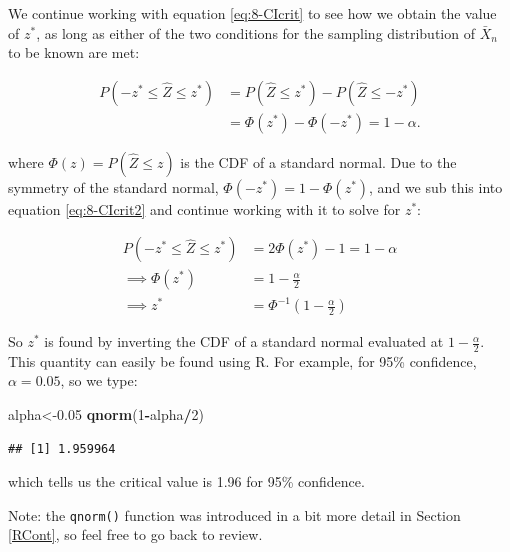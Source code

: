 \documentclass[
]{book}
\newenvironment{Shaded}{\begin{snugshade}}{\end{snugshade}}
\newcommand{\DecValTok}[1]{\textcolor[rgb]{0.00,0.00,0.81}{#1}}
\newcommand{\FloatTok}[1]{\textcolor[rgb]{0.00,0.00,0.81}{#1}}
\newcommand{\FunctionTok}[1]{\textcolor[rgb]{0.13,0.29,0.53}{\textbf{#1}}}
\newcommand{\NormalTok}[1]{#1}
\newcommand{\OtherTok}[1]{\textcolor[rgb]{0.56,0.35,0.01}{#1}}
\newcommand{\SpecialCharTok}[1]{\textcolor[rgb]{0.81,0.36,0.00}{\textbf{#1}}}
\begin{document}
We continue working with equation \eqref{eq:8-CIcrit} to see how we obtain the value of \(z^*\), as long as either of the two conditions for the sampling distribution of \(\bar{X}_n\) to be known are met:

\begin{equation} 
\begin{split}
P(-z^{*} \leq \hat{Z} \leq z^{*}) &= P(\hat{Z} \leq z^{*}) - P(\hat{Z} \leq -z^{*}) \\
                                  &= \Phi(z^{*}) - \Phi(-z^{*}) = 1 - \alpha.
\end{split}
\label{eq:8-CIcrit2}
\end{equation}

where \(\Phi(z) = P(\hat{Z} \leq z)\) is the CDF of a standard normal. Due to the symmetry of the standard normal, \(\Phi(-z^{*}) = 1- \Phi(z^{*})\), and we sub this into equation \eqref{eq:8-CIcrit2} and continue working with it to solve for \(z^*\):

\begin{equation} 
\begin{split}
P(-z^{*} \leq \hat{Z} \leq z^{*}) &= 2 \Phi(z^*) - 1 = 1 - \alpha \\
\implies \Phi(z^*) &= 1 - \frac{\alpha}{2} \\
\implies z^* &= \Phi^{-1} \left(1 - \frac{\alpha}{2} \right)
\end{split}
\label{eq:8-CIcrit3}
\end{equation}

So \(z^*\) is found by inverting the CDF of a standard normal evaluated at \(1 - \frac{\alpha}{2}\). This quantity can easily be found using R. For example, for 95\% confidence, \(\alpha = 0.05\), so we type:

\begin{Shaded}
\begin{Highlighting}[]
\NormalTok{alpha}\OtherTok{\textless{}{-}}\FloatTok{0.05}
\FunctionTok{qnorm}\NormalTok{(}\DecValTok{1}\SpecialCharTok{{-}}\NormalTok{alpha}\SpecialCharTok{/}\DecValTok{2}\NormalTok{)}
\end{Highlighting}
\end{Shaded}

\begin{verbatim}
## [1] 1.959964
\end{verbatim}

which tells us the critical value is 1.96 for 95\% confidence.

Note: the \texttt{qnorm()} function was introduced in a bit more detail in Section \ref{RCont}, so feel free to go back to review.
\end{document}
